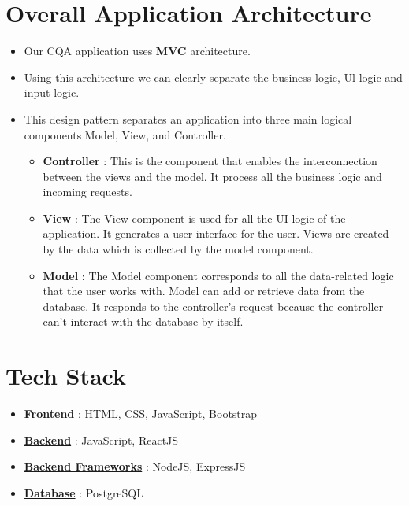 \documentclass[12pt,a4paper]{article}
\begin{document}
	\section{Overall Application Architecture}
	\begin{itemize}
		\item Our CQA application uses \textbf{MVC} architecture.
		\item Using this architecture we can clearly separate the business logic, Ul logic and input logic.
		\item This design pattern separates an application into three main logical components Model, View, and Controller.
		\begin{itemize}
			\item \textbf{Controller} : This is the component that enables the interconnection between the views and the model. It process all the business logic and incoming requests.
			\item \textbf{View} : The View component is used for all the UI logic of the application. It generates a user interface for the user. Views are created by the data which is collected by the model component.
			\item \textbf{Model} : The Model component corresponds to all the data-related logic that the user works with. Model can add or retrieve data from the database. It responds to the controller’s request because the controller can’t interact with the database by itself.
		\end{itemize}

	\end{itemize}
	\section{Tech Stack}
	\begin{itemize}
		\item \textbf{\underline{Frontend}} : HTML, CSS, JavaScript, Bootstrap
		\item \textbf{\underline{Backend}} : JavaScript,  ReactJS
		\item \textbf{\underline{Backend Frameworks}} : NodeJS, ExpressJS
		\item \textbf{\underline{Database}} : PostgreSQL
	\end{itemize}
	
\end{document}

